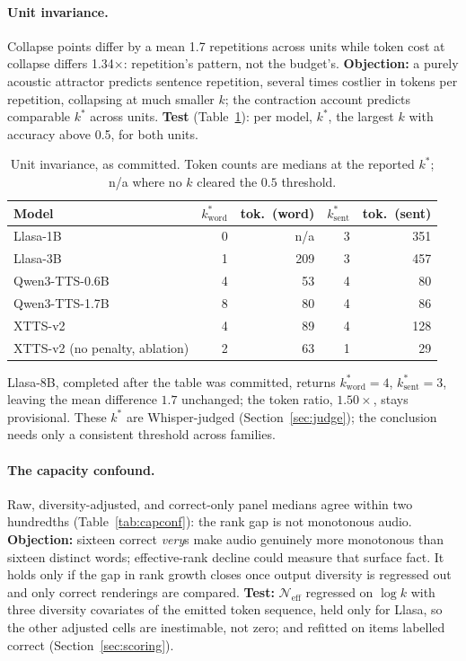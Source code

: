 \paragraph{Unit invariance.} Collapse points differ by a mean 1.7 repetitions across units while
token cost at collapse differs 1.34$\times$: repetition's pattern, not the budget's.
\textbf{Objection:} a purely acoustic attractor predicts sentence repetition, several times
costlier in tokens per repetition, collapsing at much smaller $k$; the contraction account
predicts comparable $k^\ast$ across units. \textbf{Test} (Table~\ref{tab:unitinv}): per model,
$k^\ast$, the largest $k$ with accuracy above 0.5, for both units.

\begin{table}[htbp]
\centering
\caption{Unit invariance, as committed. Token counts are medians at the reported $k^\ast$; n/a where no
$k$ cleared the $0.5$ threshold.}
\label{tab:unitinv}
\small
\begin{tabular}{@{}lrrrr@{}}
\toprule
Model & $k^\ast_{\mathrm{word}}$ & tok.\ (word) & $k^\ast_{\mathrm{sent}}$ & tok.\ (sent) \\
\midrule
Llasa-1B & 0 & n/a & 3 & 351 \\
Llasa-3B & 1 & 209 & 3 & 457 \\
Qwen3-TTS-0.6B & 4 & 53 & 4 & 80 \\
Qwen3-TTS-1.7B & 8 & 80 & 4 & 86 \\
XTTS-v2 & 4 & 89 & 4 & 128 \\
XTTS-v2 (no penalty, ablation) & 2 & 63 & 1 & 29 \\
\bottomrule
\end{tabular}
\end{table}

\noindent Llasa-8B, completed after the table was committed, returns
$k^\ast_{\mathrm{word}}{=}4$, $k^\ast_{\mathrm{sent}}{=}3$, leaving the
mean difference $1.7$ unchanged; the token ratio, $1.50\times$, stays
provisional. These $k^\ast$ are Whisper-judged
(Section~\ref{sec:judge}); the conclusion needs only a consistent
threshold across families.

\paragraph{The capacity confound.} Raw, diversity-adjusted, and correct-only panel medians agree
within two hundredths (Table~\ref{tab:capconf}): the rank gap is not monotonous audio.
\textbf{Objection:} sixteen correct \emph{very}s make audio genuinely more monotonous than
sixteen distinct words; effective-rank decline could measure that surface fact. It holds only
if the gap in rank growth closes once output diversity is regressed out and only correct
renderings are compared. \textbf{Test:}
$\mathcal{N}_{\mathrm{eff}}$ regressed on $\log k$ with three diversity covariates of the
emitted token sequence, held only for Llasa, so the other adjusted cells are inestimable, not
zero; and refitted on items labelled correct (Section~\ref{sec:scoring}).

